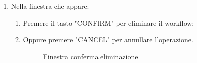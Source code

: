 \begin{enumerate}
	\newpage
	\item Nella finestra che appare:
	\begin{enumerate}
		\item Premere il tasto "CONFIRM" per eliminare il workflow;
		\item Oppure premere "CANCEL" per annullare l'operazione.
		\begin{figure}[!ht]
			\centering
			\caption{Finestra conferma eliminazione}
		\end{figure}
	\end{enumerate}
	\begin{figure}[!ht]
		\centering

\end{figure}
\end{enumerate}
